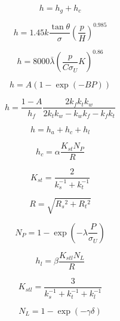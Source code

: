 \begin{equation*}
h=h_{g}+h_{c} \tag{1}
\end{equation*}

\begin{equation*}
h=1.45 k \frac{\tan \theta}{\sigma}\left(\frac{p}{H}\right)^{0.985} \tag{2}
\end{equation*}

\begin{equation*}
h=8000 \bar{\lambda}\left(\frac{p}{C \sigma_{U}} K\right)^{0.86} \tag{3}
\end{equation*}

\begin{equation*}
h=A(1-\exp (-B P)) \tag{4}
\end{equation*}

\begin{equation*}
h=\frac{1-A}{h_{f}} \frac{2 k_{f} k_{t} k_{w}}{2 k_{t} k_{w}-k_{w} k_{f}-k_{f} k_{t}} \tag{5}
\end{equation*}

\begin{equation*}
h=h_{a}+h_{c}+h_{l} \tag{6}
\end{equation*}

\begin{equation*}
h_{c}=\alpha \frac{K_{s t} N_{P}}{R} \tag{7}
\end{equation*}

\begin{equation*}
K_{s t}=\frac{2}{k_{s}^{-1}+k_{t}^{-1}} \tag{8}
\end{equation*}

\begin{equation*}
R=\sqrt{R_{s}{ }^{2}+R_{t}{ }^{2}} \tag{9}
\end{equation*}

\begin{equation*}
N_{P}=1-\exp \left(-\lambda \frac{P}{\sigma_{U}}\right) \tag{10}
\end{equation*}

\begin{equation*}
h_{l}=\beta \frac{K_{s t l} N_{L}}{R} \tag{11}
\end{equation*}

\begin{equation*}
K_{s t l}=\frac{3}{k_{s}^{-1}+k_{t}^{-1}+k_{l}^{-1}} \tag{12}
\end{equation*}

\begin{equation*}
N_{L}=1-\exp (-\gamma \delta) \tag{13}
\end{equation*}